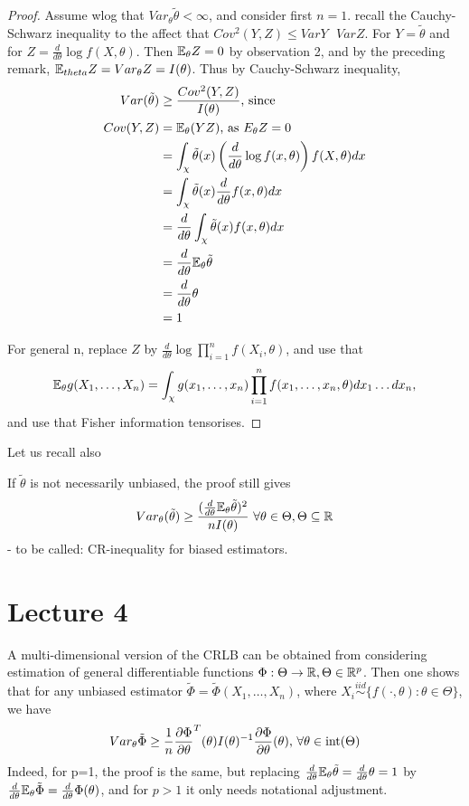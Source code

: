 \documentclass[a4paper]{article}
\begin{document}
\begin{proof}
	Assume wlog  that $Var_{\theta} \tilde{\theta} < \infty$, and consider first $n=1$. recall the Cauchy-Schwarz inequality to the affect that $Cov^2(Y, Z) \le Var Y\text{ } Var Z$. For $Y= \tilde{\theta}$ and for $Z = \frac{d}{d\theta} \log f(X, \theta)$. Then $\mathbb{E}_{\theta} Z = 0$ by observation 2, and by the preceding remark, $\mathbb{E}_{theta} Z = Var_{\theta} Z = I(\theta)$. Thus by Cauchy-Schwarz inequality,
	\begin{align*}
		Var(\tilde{\theta}) &\ge \frac{Cov^2(Y, Z)}{I(\theta)} \text{, since} \\
		Cov(Y,Z) &= \mathbb{E}_{\theta}(YZ) \text{, as } E_{\theta} Z = 0 \\
		&= \int_{\chi} \tilde{\theta} (x) \left( \frac{d}{d\theta} \log f(x,\theta) \right) f(X, \theta) dx \\
		&= \int_{\chi} \tilde{\theta}(x) \frac{d}{d\theta} f(x,\theta) dx \\
		&= \frac{d}{d\theta} \int_{\chi} \tilde{\theta}(x) f(x, \theta) dx \\
		&= \frac{d}{d\theta} \mathbb{E}_{\theta} \tilde{\theta} \\
		&= \frac{d}{d \theta} \theta \\
		&= 1
	\end{align*}

	For general n, replace $Z$ by $\frac{d}{d\theta} \log \prod_{i=1}^{n} f(X_{i}, \theta)$, and use that 
\[
	\mathbb{E}_{\theta} g(X_1, \ldots, X_n) = \int_{\chi} g(x_1, \ldots, x_n) \prod_{i=1}^{n} f(x_1, \ldots, x_n, \theta ) dx_{1} \ldots dx_{n}
,\]
and use that Fisher information tensorises. 
\end{proof}

Let us recall also

\begin{corol}
	If $\tilde{\theta}$ is not necessarily unbiased, the proof still gives
	\[
		Var_{\theta} (\tilde{\theta}) \ge \frac{(\frac{d}{d\theta} \mathbb{E}_{\theta} \tilde{\theta} )^2} {nI(\theta)} \text{ } \forall \theta \in \Theta, \Theta \subseteq \mathbb{R}
	\] - to be called: CR-inequality for biased estimators. 
\end{corol}

\section*{Lecture 4}

A multi-dimensional version of the CRLB can be obtained from considering estimation of general differentiable functions $\Phi : \Theta \to \mathbb{R}, \Theta \in \mathbb{R}^{p}$. Then one shows that for any unbiased estimator $\tilde{\Phi} = \tilde{\Phi}(X_1, \ldots, X_n)$, where $X_i \stackrel{iid}{\sim} \{f(\cdot , \theta) : \theta \in \Theta\} $, we have
\[
	Var_{\theta} \tilde{\Phi} \ge \frac{1}{n} \frac{\partial\Phi}{\partial\theta}^{T}(\theta)I(\theta)^{-1}\frac{\partial\Phi}{\partial\theta}(\theta) \text{,  } \forall \theta \in\operatorname{int}(\Theta)
\] 
Indeed, for p=1, the proof is the same, but replacing $\frac{d}{d\theta} \mathbb{E}_{\theta} \tilde{\theta} = \frac{d}{d\theta} \theta = 1$ by $\frac{d}{d\theta} \mathbb{E}_{\theta} \tilde{\Phi} = \frac{d}{d\theta} \Phi(\theta)$, and for $p>1$ it only needs notational adjustment.
\end{document}
